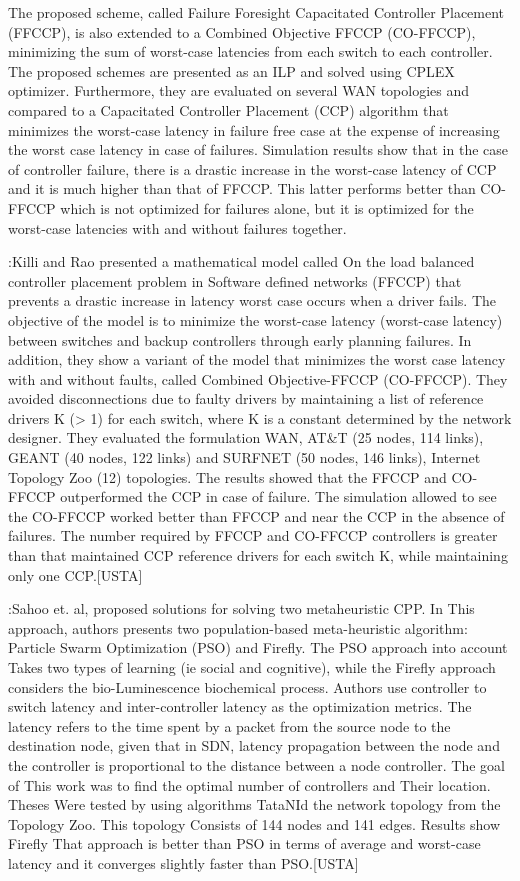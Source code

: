 \documentclass[a4paper,10pt]{article}
\begin{document}
The proposed scheme, called Failure Foresight Capacitated Controller Placement (FFCCP), is also extended to a Combined Objective FFCCP (CO-FFCCP), minimizing the sum of worst-case latencies from each switch to each controller. The proposed schemes are presented as an ILP and solved using CPLEX optimizer. Furthermore, they are evaluated on several WAN topologies and compared to a Capacitated Controller Placement (CCP) algorithm that minimizes the worst-case latency in failure free case at the expense of increasing the worst case latency in case of failures. Simulation results show that in the case of controller failure,  there is a drastic increase in the worst-case latency of CCP and it is much higher than that of FFCCP. This latter performs better than CO-FFCCP which is not optimized for failures alone, but it is optimized for the worst-case latencies with and without failures together. 


\cite{KiRa16}:Killi and Rao presented a mathematical model called On the load balanced controller placement problem in Software defined networks (FFCCP) that prevents a drastic increase in latency worst case occurs when a driver fails. The objective of the model is to minimize the worst-case latency (worst-case latency) between switches and backup controllers through early planning failures. In addition, they show a variant of the model that minimizes the worst case latency with and without faults, called Combined Objective-FFCCP (CO-FFCCP). They avoided disconnections due to faulty drivers by maintaining a list of reference drivers K (> 1) for each switch, where K is a constant determined by the network designer.
They evaluated the formulation WAN, AT&T (25 nodes, 114 links), GEANT (40 nodes, 122 links) and SURFNET (50 nodes, 146 links), Internet Topology Zoo (12) topologies. The results showed that the FFCCP and CO-FFCCP outperformed the CCP in case of failure. The simulation allowed to see the CO-FFCCP worked better than FFCCP and near the CCP in the absence of failures. The number required by FFCCP and CO-FFCCP controllers is greater than that maintained CCP reference drivers for each switch K, while maintaining only one CCP.[USTA]


\cite{SaSa17}:Sahoo et. al, proposed solutions for solving two metaheuristic CPP. In This approach, authors presents two population-based meta-heuristic algorithm: Particle Swarm Optimization (PSO) and Firefly. The PSO approach into account Takes two types of learning (ie social and cognitive), while the Firefly approach considers the bio-Luminescence biochemical process. Authors use controller to switch latency and inter-controller latency as the optimization metrics. The latency refers to the time spent by a packet from the source node to the destination node, given that in SDN, latency propagation between the node and the controller is proportional to the distance between a node controller. The goal of This work was to find the optimal number of controllers and Their location. Theses Were tested by using algorithms TataNId the network topology from the Topology Zoo. This topology Consists of 144 nodes and 141 edges. Results show Firefly That approach is better than PSO in terms of average and worst-case latency and it converges slightly faster than PSO.[USTA]
\end{document}
